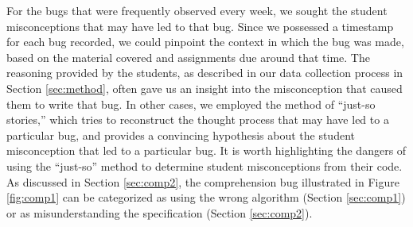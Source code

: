 \documentclass{sig-alternate}
\begin{document}
For the bugs that were frequently observed every week, we sought the student misconceptions that may have led to that bug. Since we possessed a timestamp for each bug recorded, we could pinpoint the context in which the bug was made, based on the material covered and assignments due around that time. The reasoning provided by the students, as described in our data collection process in Section \ref{sec:method}, often gave us an insight into the misconception that caused them to write that bug. In other cases, we employed the method of ``just-so stories,'' \cite{JoniSolowayGoldmanEhrlich83} which tries to reconstruct the thought process that may have led to a particular bug, and provides a convincing hypothesis about the student misconception that led to a particular bug. It is worth highlighting the dangers of using the ``just-so'' method to determine student misconceptions from their code. As discussed in Section \ref{sec:comp2}, the comprehension bug illustrated in Figure \ref{fig:comp1} can be categorized as using the wrong algorithm (Section \ref{sec:comp1}) or as misunderstanding the specification (Section \ref{sec:comp2}).\\


\end{document}
